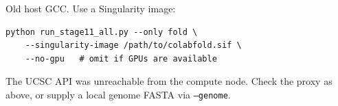 \documentclass[11pt]{article}
\begin{document}
\begin{description}[leftmargin=0pt,itemsep=8pt]
  \item[\textit{ColabFold hangs or crashes on HPC.}]
        Old host GCC. Use a Singularity image:
\begin{lstlisting}
python run_stage11_all.py --only fold \
    --singularity-image /path/to/colabfold.sif \
    --no-gpu   # omit if GPUs are available
\end{lstlisting}

  \item[\textit{Sequences are all ``N'' or empty.}]
        The UCSC API was unreachable from the compute node. Check the
        proxy as above, or supply a local genome FASTA via
        \texttt{--genome}.

\end{description}
\end{document}
